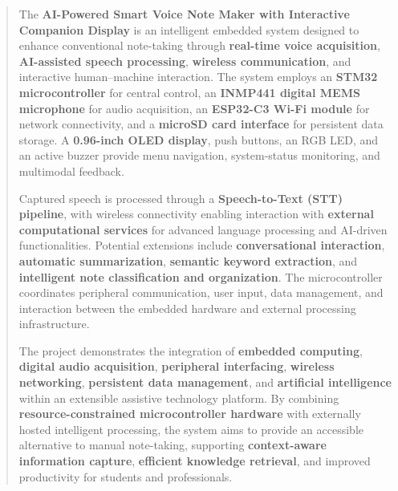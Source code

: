 \documentclass[a4paper,12pt,oneside]{report}
\begin{document}

\begin{abstract}

The \textbf{AI-Powered Smart Voice Note Maker with Interactive Companion Display} is an intelligent embedded system designed to enhance conventional note-taking through \textbf{real-time voice acquisition}, \textbf{AI-assisted speech processing}, \textbf{wireless communication}, and interactive human--machine interaction. The system employs an \textbf{STM32 microcontroller} for central control, an \textbf{INMP441 digital MEMS microphone} for audio acquisition, an \textbf{ESP32-C3 Wi-Fi module} for network connectivity, and a \textbf{microSD card interface} for persistent data storage. A \textbf{0.96-inch OLED display}, push buttons, an RGB LED, and an active buzzer provide menu navigation, system-status monitoring, and multimodal feedback.

Captured speech is processed through a \textbf{Speech-to-Text (STT) pipeline}, with wireless connectivity enabling interaction with \textbf{external computational services} for advanced language processing and AI-driven functionalities. Potential extensions include \textbf{conversational interaction}, \textbf{automatic summarization}, \textbf{semantic keyword extraction}, and \textbf{intelligent note classification and organization}. The microcontroller coordinates peripheral communication, user input, data management, and interaction between the embedded hardware and external processing infrastructure.

The project demonstrates the integration of \textbf{embedded computing}, \textbf{digital audio acquisition}, \textbf{peripheral interfacing}, \textbf{wireless networking}, \textbf{persistent data management}, and \textbf{artificial intelligence} within an extensible assistive technology platform. By combining \textbf{resource-constrained microcontroller hardware} with externally hosted intelligent processing, the system aims to provide an accessible alternative to manual note-taking, supporting \textbf{context-aware information capture}, \textbf{efficient knowledge retrieval}, and improved productivity for students and professionals.

\end{abstract}

\newpage
\tableofcontents

\newpage
\renewcommand\thepage{\arabic{page}}
\end{document}
